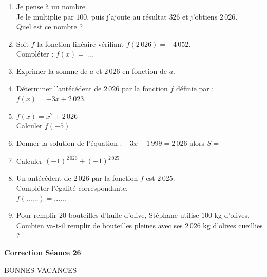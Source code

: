 \documentclass[a4paper,11pt]{article}
\begin{document}
\begin{seance}{}
\begin{enumerate}[start=19]
\begin{tikzpicture}[baseline,scale = 0.6]
\end{tikzpicture}
	\item Je pense à un nombre. \\
    Je le multiplie par $100$, puis j'ajoute au résultat $326$ et j'obtiens $2\,026$. \\
  Quel est ce nombre ? \dotfill
	\item Soit $f$ la fonction linéaire vérifiant $f(2\,026)=-4\,052$.\\
    Compléter : $f(x)=$ $\ldots$
	\item Exprimer la somme de $a$ et $2\,026$ en fonction de $a$. \dotfill
	\item Déterminer l'antécédent de $2\,026$ par la fonction $f$ définie par : $f(x)=-3x+2\,023$. 
\\
\dotfill
	\item $f(x)=x^2+2\,026$\\Calculer $f(-5)=$\dotfill
	\item Donner la solution de l'équation : $-3x+1\,999=2\,026$ alors $S=$\dotfill
	\item Calculer  $(-1)^{2\,026}+(-1)^{2\,025}=$\dotfill
	\item Un antécédent de $2\,026$ par la fonction $f$ est $2\,025$.\\ Compléter l'égalité correspondante.\\$f(\ldots\ldots) =\ldots\ldots$
	\item Pour remplir $20$ bouteilles d'huile d'olive, Stéphane utilise $100$ kg d'olives.\\
      Combien va-t-il remplir de bouteilles pleines avec ses $2\,026$ kg d'olives cueillies ?
      
      \bigskip
      
      \dotfill
\end{enumerate}

\end{seance}

\vspace{0.5cm}
\begin{center}

\textbf{\textcolor{Couleur8}{Correction Séance 26}}\\
\vspace{2mm}
\end{center}

\begin{seanceD}{} %

BONNES VACANCES
\end{seanceD}
\end{document}
